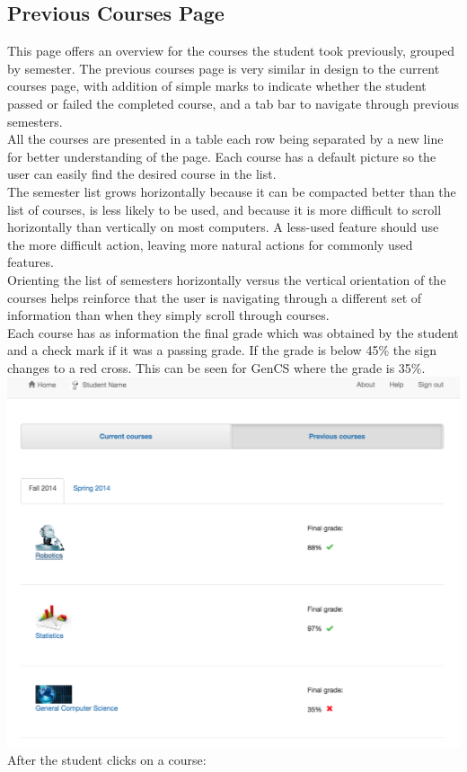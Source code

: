 \subsection{Previous Courses Page}

This page offers an overview for the courses the student took previously, grouped by semester. The previous courses page is very similar in design to the current courses page, with addition of simple marks to indicate whether the student passed or failed the completed course, and a tab bar to navigate through previous semesters.\\
All the courses are presented in a table each row being separated by a new line for better understanding of the page. Each course has a default picture so the user can easily find the desired course in the list. \\
The semester list grows horizontally because it can be compacted better than the list of courses, is less likely to be used, and because it is more difficult to scroll horizontally than vertically on most computers. A less-used feature should use the more difficult action, leaving more natural actions for commonly used features.\\
Orienting the list of semesters horizontally versus the vertical orientation of the courses helps reinforce that the user is navigating through a different set of information than when they simply scroll through courses.\\
Each course has as information the final grade which was obtained by the student and a check mark if it was a passing grade. If the grade is below 45\% the sign changes to a red cross. This can be seen for GenCS where the grade is 35\%.\\
\includegraphics[width=.6\textwidth]{screenshots/PrevoiusCoursesOverview.png}
\newpage
After the student clicks on a course:

